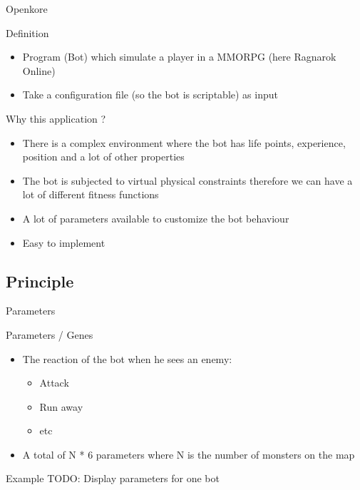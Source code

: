 \begin{frame}{Openkore}

  \begin{block}{Definition}
    \begin{itemize}
    \item Program (Bot) which simulate a player in a MMORPG (here Ragnarok Online)
    \item Take a configuration file (so the bot is scriptable) as input
    \end{itemize}
  \end{block}

  \begin{block}{Why this application ?}
    \begin{itemize}
    \item There is a complex environment where the bot has life points, experience, position and a lot of other properties
    \item The bot is subjected to virtual physical constraints therefore we can have a lot of different fitness functions
    \item A lot of parameters available to customize the bot behaviour
    \item Easy to implement
    \end{itemize}
  \end{block}

\end{frame}
\subsection{Principle}

\begin{frame}{Parameters}

  \begin{block}{Parameters / Genes}
    \begin{itemize}
    \item The reaction of the bot when he sees an enemy:
      \begin{itemize}
      \item Attack
      \item Run away
      \item etc
      \end{itemize}
    \item A total of N * 6 parameters where N is the number of monsters on the map
    \end{itemize}
  \end{block}

  \begin{block}{Example}
    TODO: Display parameters for one bot
  \end{block}

\end{frame}

